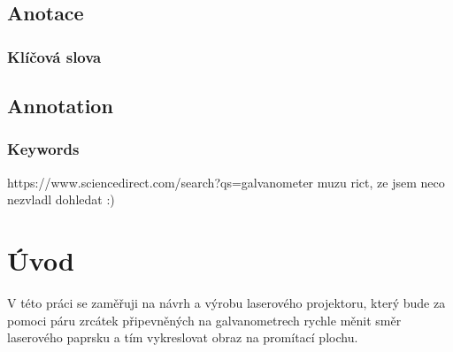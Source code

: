 \documentclass{template/socthesis}
\author{Šimon Hrouda}
\begin{document}
\newcommand{\bardgen}[3]{following text generated by ai (google bard) on #1\\%
  \begin{tcolorbox}[breakable, colback=blue!20]
    #2
  \end{tcolorbox}
  \begin{tcolorbox}[breakable, colback=blue!10, colframe=white]
    #3
  \end{tcolorbox}
}


\maketitle



\pagestyle{empty}

\section*{Anotace}


\subsection*{Klíčová slova}


\vspace{20mm}

\section*{Annotation}


\subsection*{Keywords}


\newpage
\pagestyle{plain}

\tableofcontents %

\setcounter{figure}{0}
\setcounter{table}{0}
\newpage

https://www.sciencedirect.com/search?qs=galvanometer
muzu rict, ze jsem neco nezvladl dohledat :)

\chapter*{Úvod}
V této práci se zaměřuji na návrh a výrobu laserového projektoru, který bude za pomoci páru zrcátek připevněných na galvanometrech rychle měnit směr laserového paprsku a tím vykreslovat obraz na promítací plochu.
\end{document}
